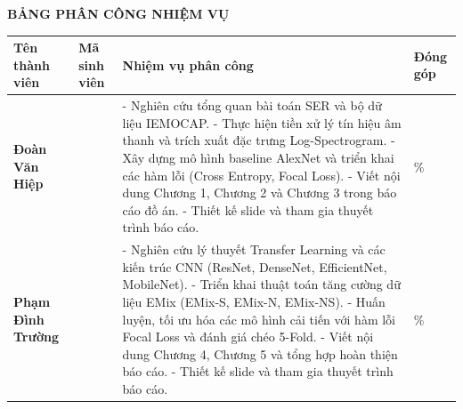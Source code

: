 \thispagestyle{empty}
\begin{center}
    \vspace*{1.5cm}
    {\fontsize{14pt}{17pt}\selectfont\bfseries BẢNG PHÂN CÔNG NHIỆM VỤ}\\[1.5cm]
    
    \renewcommand{\arraystretch}{1.2}
    \begin{longtable}{|p{3.0cm}|>{\centering\arraybackslash}p{2.0cm}|p{7.0cm}|>{\centering\arraybackslash}p{1.8cm}|}
    \hline
    \textbf{Tên thành viên} & \textbf{Mã sinh viên} & \textbf{Nhiệm vụ phân công} & \textbf{Đóng góp} \\ \hline
    \textbf{Đoàn Văn Hiệp} & 23010739 & 
    - Nghiên cứu tổng quan bài toán SER và bộ dữ liệu IEMOCAP.\newline
    - Thực hiện tiền xử lý tín hiệu âm thanh và trích xuất đặc trưng Log-Spectrogram.\newline
    - Xây dựng mô hình baseline AlexNet và triển khai các hàm lỗi (Cross Entropy, Focal Loss).\newline
    - Viết nội dung Chương 1, Chương 2 và Chương 3 trong báo cáo đồ án.\newline
    - Thiết kế slide và tham gia thuyết trình báo cáo.
    & 50\% \\ \hline
    \textbf{Phạm Đình Trường} & 23010136 & 
    - Nghiên cứu lý thuyết Transfer Learning và các kiến trúc CNN (ResNet, DenseNet, EfficientNet, MobileNet).\newline
    - Triển khai thuật toán tăng cường dữ liệu EMix (EMix-S, EMix-N, EMix-NS).\newline
    - Huấn luyện, tối ưu hóa các mô hình cải tiến với hàm lỗi Focal Loss và đánh giá chéo 5-Fold.\newline
    - Viết nội dung Chương 4, Chương 5 và tổng hợp hoàn thiện báo cáo.\newline
    - Thiết kế slide và tham gia thuyết trình báo cáo.
    & 50\% \\ \hline
    \end{longtable}
\end{center}
\newpage
\restoregeometry
